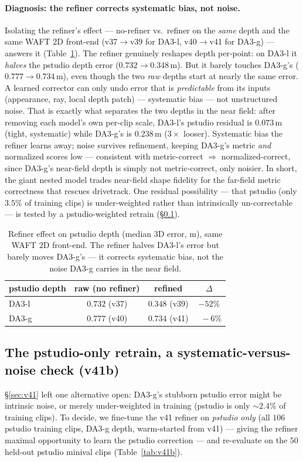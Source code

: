 \documentclass[11pt,a4paper]{article}
\begin{document}
\paragraph{Diagnosis: the refiner corrects systematic bias, not noise.}
Isolating the refiner's effect --- no-refiner vs.\ refiner on the \emph{same} depth and the same WAFT 2D
front-end (v37$\to$v39 for DA3-l, v40$\to$v41 for DA3-g) --- answers it (Table~\ref{tab:v41-refiner}).
The refiner genuinely reshapes depth per-point: on DA3-l it \emph{halves} the pstudio depth error
($0.732\!\to\!0.348$\,m). But it barely touches DA3-g's ($0.777\!\to\!0.734$\,m), even though the two
\emph{raw} depths start at nearly the same error. A learned corrector can only undo error that is
\emph{predictable} from its inputs (appearance, ray, local depth patch) --- systematic bias --- not
unstructured noise. That is exactly what separates the two depths in the near field: after removing each
model's own per-clip scale, DA3-l's pstudio residual is $0.073$\,m (tight, systematic) while DA3-g's is
$0.238$\,m ($3\times$ looser). Systematic bias the refiner learns away; noise survives refinement, keeping
DA3-g's metric \emph{and} normalized scores low --- consistent with metric-correct $\Rightarrow$
normalized-correct, since DA3-g's near-field depth is simply not metric-correct, only noisier. In short,
the giant nested model trades near-field shape fidelity for the far-field metric correctness that rescues
drivetrack. One residual possibility --- that pstudio (only $3.5\%$ of training clips) is under-weighted
rather than intrinsically un-correctable --- is tested by a pstudio-weighted retrain (\S\ref{sec:v41b}).

\begin{table}[h]
\centering
\caption{Refiner effect on pstudio depth (median 3D error, m), same WAFT 2D front-end. The refiner halves
DA3-l's error but barely moves DA3-g's --- it corrects systematic bias, not the noise DA3-g carries in the
near field.}
\label{tab:v41-refiner}
\begin{tabular}{lccc}
\toprule
pstudio depth & raw (no refiner) & refined & $\Delta$ \\
\midrule
DA3-l & $0.732$ (v37) & $\mathbf{0.348}$ (v39) & $-52\%$ \\
DA3-g & $0.777$ (v40) & $0.734$ (v41) & $\phantom{0}-6\%$ \\
\bottomrule
\end{tabular}
\end{table}

\subsection{The pstudio-only retrain, a systematic-versus-noise check (v41b)}
\label{sec:v41b}
\S\ref{sec:v41} left one alternative open: DA3-g's stubborn pstudio error might be intrinsic noise, or
merely under-weighted in training (pstudio is only ${\sim}2.4\%$ of training clips). To decide, we fine-tune
the v41 refiner on \emph{pstudio only} (all $106$ pstudio training clips, DA3-g depth, warm-started from
v41) --- giving the refiner maximal opportunity to learn the pstudio correction --- and re-evaluate on the
$50$ held-out pstudio minival clips (Table~\ref{tab:v41b}).
\end{document}
